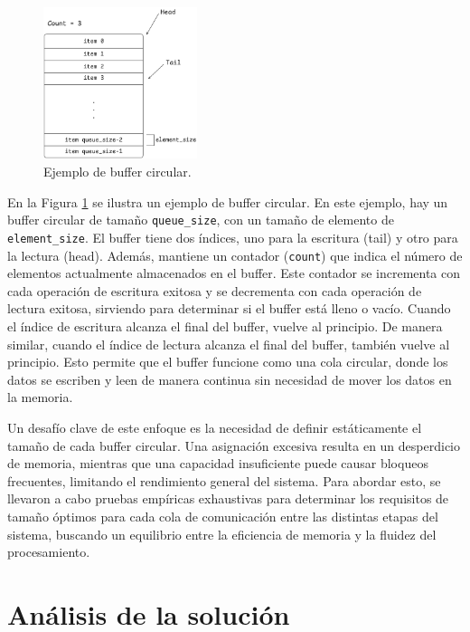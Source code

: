 \documentclass[11pt,spanish,listoffigures,listoftables]{tfgetsinf}
\begin{document}
\begin{figure}[H]
   \centering
   \includegraphics[width=0.4\textwidth]{images/diseno_e_implementacion/buffer_circular.png}
   \caption{Ejemplo de buffer circular.}
   \label{fig:buffer_circular}
\end{figure}

En la Figura \ref{fig:buffer_circular} se ilustra un ejemplo de buffer circular. En este ejemplo, hay un buffer circular de tamaño \texttt{queue\_size}, con un tamaño de elemento de \texttt{element\_size}. El buffer tiene dos índices, uno para la escritura (tail) y otro para la lectura (head). Además, mantiene un contador (\texttt{count}) que indica el número de elementos actualmente almacenados en el buffer. Este contador se incrementa con cada operación de escritura exitosa y se decrementa con cada operación de lectura exitosa, sirviendo para determinar si el buffer está lleno o vacío. Cuando el índice de escritura alcanza el final del buffer, vuelve al principio. De manera similar, cuando el índice de lectura alcanza el final del buffer, también vuelve al principio. Esto permite que el buffer funcione como una cola circular, donde los datos se escriben y leen de manera continua sin necesidad de mover los datos en la memoria.

Un desafío clave de este enfoque es la necesidad de definir estáticamente el tamaño de cada buffer circular. Una asignación excesiva resulta en un desperdicio de memoria, mientras que una capacidad insuficiente puede causar bloqueos frecuentes, limitando el rendimiento general del sistema. Para abordar esto, se llevaron a cabo pruebas empíricas exhaustivas para determinar los requisitos de tamaño óptimos para cada cola de comunicación entre las distintas etapas del sistema, buscando un equilibrio entre la eficiencia de memoria y la fluidez del procesamiento.


\chapter{Análisis de la solución}
\end{document}
